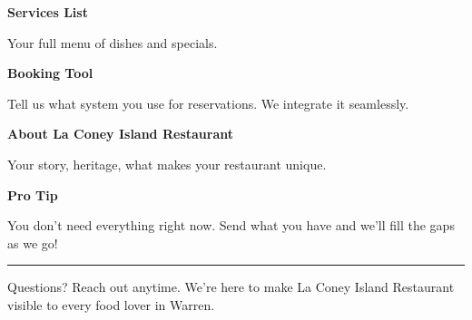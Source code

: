 \documentclass[11pt,letterpaper]{article}
\begin{document}
\begin{minipage}[t]{0.48\textwidth}
\begin{tcolorbox}[colframe=accent-teal, boxrule=1pt, left=0.7em, right=0.7em, top=0.5em, bottom=0.5em, arc=4pt, boxsep=0pt]
{\bfseries\small\color{accent-teal}Services List}

\vspace{0.15em}

{\small Your full menu of dishes and specials.}
\end{tcolorbox}

\vspace{0.1em}

\begin{tcolorbox}[colframe=accent-teal, boxrule=1pt, left=0.7em, right=0.7em, top=0.5em, bottom=0.5em, arc=4pt, boxsep=0pt]
{\bfseries\small\color{accent-teal}Booking Tool}

\vspace{0.15em}

{\small Tell us what system you use for reservations. We integrate it seamlessly.}
\end{tcolorbox}

\vspace{0.1em}

\begin{tcolorbox}[colframe=accent-teal, boxrule=1pt, left=0.7em, right=0.7em, top=0.5em, bottom=0.5em, arc=4pt, boxsep=0pt]
{\bfseries\small\color{accent-teal}About La Coney Island Restaurant}

\vspace{0.15em}

{\small Your story, heritage, what makes your restaurant unique.}
\end{tcolorbox}

\vspace{-0.2em}
\end{minipage}

\vspace{0.15em}

\begin{tcolorbox}[colback={accent-red!5}, colframe=accent-red!20, boxrule=0.5pt, left=0.7em, right=0.7em, top=0.4em, bottom=0.4em, arc=6pt, boxsep=0pt]

{\bfseries\small\color{accent-red}Pro Tip}

\vspace{0.1em}

{\small You don't need everything right now. Send what you have and we'll fill the gaps as we go!}

\end{tcolorbox}

\vspace{0.15em}

\noindent\hrule
\vspace{0.2em}

{\small\color{text-light}Questions? Reach out anytime. We're here to make La Coney Island Restaurant visible to every food lover in Warren.}
\end{document}
